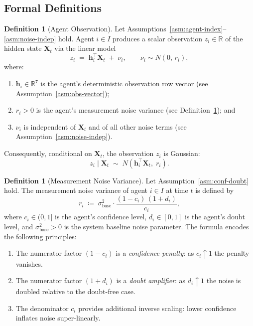 \documentclass[12pt,openany]{book}
\numberwithin{equation}{chapter}
\theoremstyle{plain}
\theoremstyle{definition}
\newtheorem{definition}[theorem]{Definition}
\theoremstyle{remark}
\def\mathcal#1{#1}%
\begin{document}
\subsection*{Formal Definitions}

\begin{definition}[Agent Observation]
\label{def:observation}
Let Assumptions~\ref{asm:agent-index}--\ref{asm:noise-indep}
hold.  Agent $i \in \mathcal{I}$ produces a scalar observation
$z_i \in \mathbb{R}$ of the hidden state $\mathbf{X}_t$ via the
linear model
\begin{equation}
  z_i \;=\; \mathbf{h}_i^\top \mathbf{X}_t \;+\; \nu_i,
  \qquad \nu_i \sim \mathcal{N}(0,\, r_i),
  \label{eq:observation-model}
\end{equation}
where:
\begin{enumerate}
  \item $\mathbf{h}_i \in \mathbb{R}^7$ is the agent's
        deterministic observation row vector (see
        Assumption~\ref{asm:obs-vector});
  \item $r_i > 0$ is the agent's measurement noise variance
        (see Definition~\ref{def:measurement-noise}); and
  \item $\nu_i$ is independent of $\mathbf{X}_t$ and of all
        other noise terms (see Assumption~\ref{asm:noise-indep}).
\end{enumerate}
Consequently, conditional on $\mathbf{X}_t$, the observation
$z_i$ is Gaussian:
\begin{equation}
  z_i \mid \mathbf{X}_t
  \;\sim\;
  \mathcal{N}\!\left(\mathbf{h}_i^\top \mathbf{X}_t,\; r_i\right).
  \label{eq:obs-conditional}
\end{equation}
\end{definition}

\begin{definition}[Measurement Noise Variance]
\label{def:measurement-noise}
Let Assumption~\ref{asm:conf-doubt} hold.
The measurement noise variance of agent $i \in \mathcal{I}$ at
time $t$ is defined by
\begin{equation}
  r_i \;\coloneqq\; \sigma_{\mathrm{base}}^2 \cdot
  \frac{(1 - c_i)\,(1 + d_i)}{c_i},
  \label{eq:measurement-noise}
\end{equation}
where $c_i \in (0,1]$ is the agent's confidence level,
$d_i \in [0,1]$ is the agent's doubt level, and
$\sigma_{\mathrm{base}}^2 > 0$ is the system baseline noise
parameter.  The formula encodes the following principles:
\begin{enumerate}
  \item The numerator factor $(1 - c_i)$ is a \emph{confidence
        penalty}: as $c_i \uparrow 1$ the penalty vanishes.
  \item The numerator factor $(1 + d_i)$ is a \emph{doubt
        amplifier}: as $d_i \uparrow 1$ the noise is doubled
        relative to the doubt-free case.
  \item The denominator $c_i$ provides additional inverse
        scaling: lower confidence inflates noise super-linearly.
\end{enumerate}
\end{definition}
\end{document}

